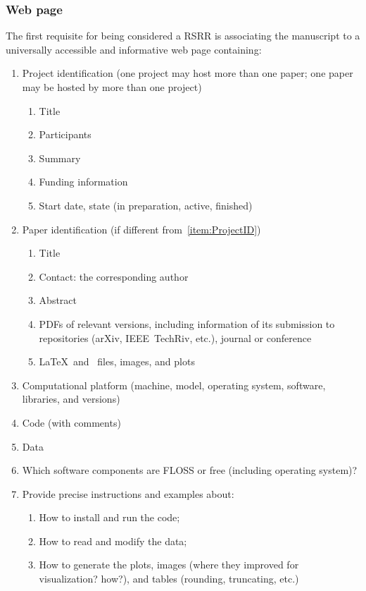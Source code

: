 \documentclass[journal,twoside]{IEEEtran}
\begin{document}
\subsubsection{Web page}\label{Sec:WebPage}
The first requisite for being considered a RSRR is associating the manuscript to a universally accessible and informative web page containing:
\begin{enumerate}
	\item\label{item:ProjectID} Project identification (one project may host more than one paper; one paper may be hosted by more than one project)
	\begin{enumerate}
		\item Title
		\item Participants
		\item Summary
		\item Funding information
		\item Start date, state (in preparation, active, finished)
	\end{enumerate}
	\item Paper identification (if different from~\ref{item:ProjectID})
	\begin{enumerate}
		\item Title
		\item Contact: the corresponding author
		\item Abstract
		\item PDFs of relevant versions, including information of its submission to repositories (arXiv, IEEE~TechRiv,             etc.), journal or conference
		\item\label{item:SourceDocumentFiles} \LaTeX\ and \BibTeX\ files, images, and plots
	\end{enumerate}
	\item\label{item:Platform} Computational platform (machine, model, operating system, software, libraries, and versions)
	\item Code (with comments)
	\item Data
	\item Which software components are FLOSS or free (including operating system)?
	\item Provide precise instructions and examples about:
	\begin{enumerate}
		\item How to install and run the code;
		\item How to read and modify the data;
		\item How to generate the plots, images (where they improved for visualization? how?), and tables (rounding, truncating, etc.)
	\end{enumerate}
\end{enumerate}
\end{document}
